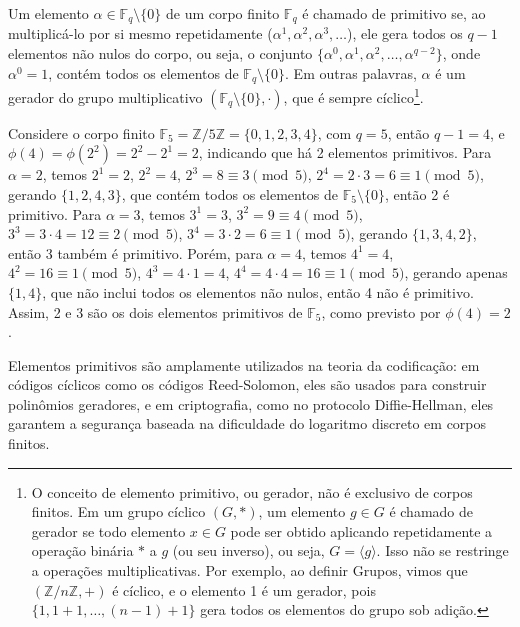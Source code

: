 \begin{definition}
Um elemento $\alpha \in \mathbb{F}_q \setminus \{0\}$ de um corpo finito $\mathbb{F}_q$
é chamado de primitivo se, ao multiplicá-lo por si mesmo repetidamente ($\alpha^1, \alpha^2, \alpha^3, \ldots $),
ele gera todos os $q-1$ elementos não nulos do corpo, ou seja, o conjunto $\{ \alpha^0, \alpha^1, \alpha^2, \ldots, \alpha^{q-2} \}$,
onde $\alpha^0 = 1$, contém todos os elementos de $\mathbb{F}_q \setminus \{0\}$.
Em outras palavras, $\alpha$ é um gerador do grupo multiplicativo $(\mathbb{F}_q \setminus \{0\}, \cdot)$,
que é sempre cíclico\footnote{
  O conceito de elemento primitivo, ou gerador, não é exclusivo de corpos
  finitos. Em um grupo cíclico $(G, *)$, um elemento $g \in G$ é
  chamado de gerador se todo elemento $x \in G$ pode ser obtido aplicando
  repetidamente a operação binária $*$ a $g$ (ou seu inverso), ou seja,
  $G = \langle g \rangle$. Isso não se restringe a operações
  multiplicativas. Por exemplo, ao definir Grupos, vimos que $(\mathbb{Z}/n\mathbb{Z}, +)$
  é cíclico, e o elemento 1 é um gerador, pois $\{1, 1+1, \ldots, (n-1)+1\}$
  gera todos os elementos do grupo sob adição. 
  }.

\end{definition}

\begin{example}
Considere o corpo finito $\mathbb{F}_5 = \mathbb{Z}/5\mathbb{Z} = \{0, 1, 2, 3, 4\}$,
com $q = 5$, então $q-1 = 4$, e $\phi(4) = \phi(2^2) = 2^2 - 2^1 = 2$, indicando
que há 2 elementos primitivos. Para $\alpha = 2$, temos $2^1 = 2$, $2^2 = 4$, 
$2^3 = 8 \equiv 3 \pmod{5}$, $2^4 = 2 \cdot 3 = 6 \equiv 1 \pmod{5}$, gerando $\{1, 2, 4, 3\}$,
que contém todos os elementos de $\mathbb{F}_5 \setminus \{0\}$, então 2 é primitivo.
Para $\alpha = 3$, temos $3^1 = 3$, $3^2 = 9 \equiv 4 \pmod{5}$, $3^3 = 3 \cdot 4 = 12 \equiv 2 \pmod{5}$,
$3^4 = 3 \cdot 2 = 6 \equiv 1 \pmod{5}$, gerando $\{1, 3, 4, 2\}$, então 3 também é primitivo.
Porém, para $\alpha = 4$, temos $4^1 = 4$, $4^2 = 16 \equiv 1 \pmod{5}$, $4^3 = 4 \cdot 1 = 4$,
$4^4 = 4 \cdot 4 = 16 \equiv 1 \pmod{5}$, gerando apenas $\{1, 4\}$, que não inclui todos os
elementos não nulos, então 4 não é primitivo. Assim, 2 e 3 são os dois elementos primitivos
de $\mathbb{F}_5$, como previsto por $\phi(4) = 2$. 
\end{example}

Elementos primitivos são amplamente utilizados na teoria da codificação: em
códigos cíclicos como os códigos Reed-Solomon, eles são usados para construir
polinômios geradores, e em criptografia, como no protocolo Diffie-Hellman, eles
garantem a segurança baseada na dificuldade do logaritmo discreto em corpos
finitos.


